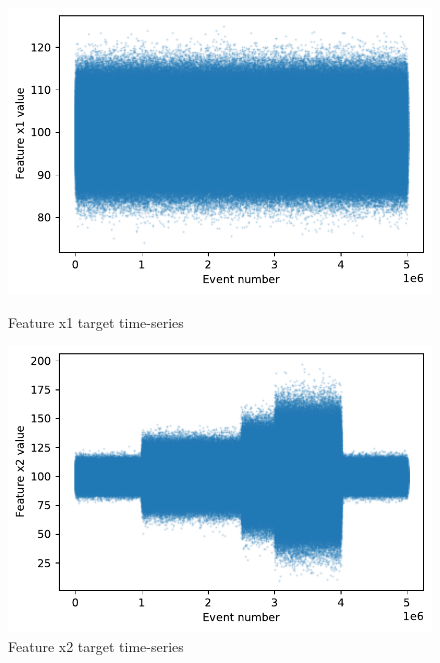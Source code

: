 \begin{figure}[!htb] 
  \begin{minipage}[b]{0.5\linewidth}
    \centering
    \includegraphics[width=1\linewidth]{figures/timeseries-t6-x1.pdf} 
    \caption{Feature x1 target time-series} 
    \label{fig:timeseries-t6-x1} 
    \vspace{4ex}
  \end{minipage}%
  \begin{minipage}[b]{0.5\linewidth}
    \centering
    \includegraphics[width=1\linewidth]{figures/timeseries-t6-x2.pdf} 
    \caption{Feature x2 target time-series} 
    \label{fig:timeseries-t6-x2} 
    \vspace{4ex}
  \end{minipage} 
  \begin{minipage}[b]{0.5\linewidth}
    \centering

\end{minipage}
\end{figure}
